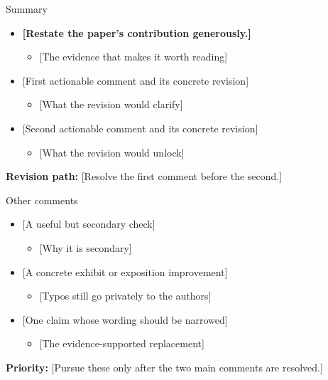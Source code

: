 \documentclass[11pt, aspectratio=169]{beamer}
\begin{document}
\begin{frame}[t]{Summary}
  \medskip
  \begin{itemize}\setlength{\itemsep}{0.8em}
    \item \textbf{[Restate the paper's contribution generously.]}
      \begin{itemize}\item {[The evidence that makes it worth reading]}\end{itemize}
    \item {} [First actionable comment and its concrete revision]
      \begin{itemize}\item {[What the revision would clarify]}\end{itemize}
    \item {} [Second actionable comment and its concrete revision]
      \begin{itemize}\item {[What the revision would unlock]}\end{itemize}
  \end{itemize}
  \par\medskip
  \textbf{Revision path:} [Resolve the first comment before the second.]
\end{frame}

\begin{frame}[noframenumbering]{Other comments}
  \begin{itemize}
    \item {} [A useful but secondary check]
      \begin{itemize}\item {[Why it is secondary]}\end{itemize}
    \item {} [A concrete exhibit or exposition improvement]
      \begin{itemize}\item {[Typos still go privately to the authors]}\end{itemize}
    \item {} [One claim whose wording should be narrowed]
      \begin{itemize}\item {[The evidence-supported replacement]}\end{itemize}
  \end{itemize}
  \bigskip
  \textbf{Priority:} [Pursue these only after the two main comments are resolved.]
\end{frame}
\end{document}
